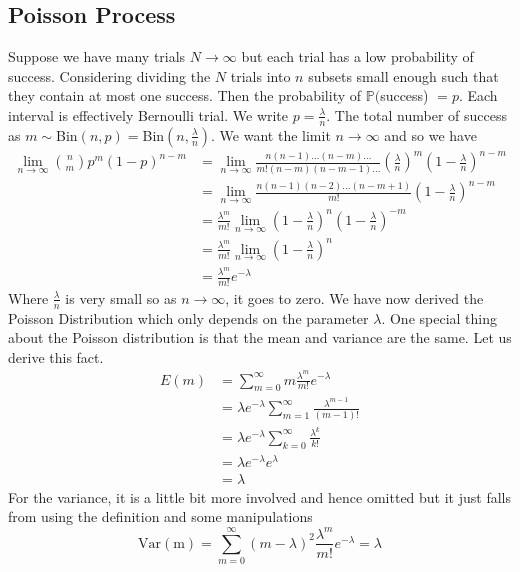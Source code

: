 \documentclass{article}
\newcommand{\p}{\mathbb{P}}
\theoremstyle{definition}
\begin{document}
\subsection{Poisson Process}
Suppose we have many trials $N\to \infty$ but each trial has a low probability of success. Considering dividing the $N$ trials into $n$ subsets small enough such that they contain at most one success. Then the probability of $\p($success) $=p$. Each interval is effectively Bernoulli trial. We write $p=\frac{\lambda}{n}$. The total number of success as $m\sim $Bin$(n,p)=$Bin$(n,\frac{\lambda}{n})$. We want the limit $n\to \infty$ and so we have 
\begin{equation*}
    \begin{split}
        \lim_{n\to \infty} \binom{n}{m} p^m (1-p)^{n-m} &= \lim_{n\to \infty} \frac{n(n-1)\ldots (n-m)\ldots}{m!(n-m)(n-m-1)\ldots} \left( \frac{\lambda}{n} \right)^m \left(1-\frac{\lambda}{n} \right)^{n-m} \\
        &= \lim_{n\to \infty} \frac{n(n-1)(n-2)\ldots(n-m+1)}{m!}\left(1-\frac{\lambda}{n} \right)^{n-m} \\
        &= \frac{\lambda^m}{m!}\lim_{n\to \infty}\left(1-\frac{\lambda}{n} \right)^n\left(1-\frac{\lambda}{n}\right)^{-m} \\
        &= \frac{\lambda^m}{m!}\lim_{n\to \infty}\left(1-\frac{\lambda}{n}\right)^n \\
        &= \frac{\lambda^m}{m!}e^{-\lambda}
    \end{split}
\end{equation*}
Where $\frac{\lambda}{n}$ is very small so as $n\to \infty$, it goes to zero. We have now derived the Poisson Distribution which only depends on the parameter $\lambda$. One special thing about the Poisson distribution is that the mean and variance are the same. Let us derive this fact.
\begin{equation*}
    \begin{split}
        E(m) &= \sum^\infty_{m=0} m\frac{\lambda^m}{m!} e^{-\lambda} \\
        &= \lambda e^{-\lambda} \sum^\infty_{m=1} \frac{\lambda^{m-1}}{(m-1)!} \\
        &= \lambda e^{-\lambda}\sum^\infty_{k=0} \frac{\lambda^k}{k!} \\
        &= \lambda e^{-\lambda}e^{\lambda} \\
        &= \lambda
    \end{split}
\end{equation*}
For the variance, it is a little bit more involved and hence omitted but it just falls from using the definition and some manipulations
\begin{equation*}
    \operatorname{Var(m)} = \sum^\infty_{m=0} (m-\lambda)^2 \frac{\lambda^m}{m!} e^{-\lambda} =\lambda
\end{equation*}
\end{document}
